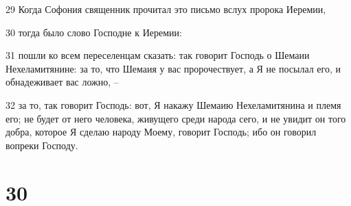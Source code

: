 \par 29 Когда Софония священник прочитал это письмо вслух пророка Иеремии,
\par 30 тогда было слово Господне к Иеремии:
\par 31 пошли ко всем переселенцам сказать: так говорит Господь о Шемаии Нехеламитянине: за то, что Шемаия у вас пророчествует, а Я не посылал его, и обнадеживает вас ложно, --
\par 32 за то, так говорит Господь: вот, Я накажу Шемаию Нехеламитянина и племя его; не будет от него человека, живущего среди народа сего, и не увидит он того добра, которое Я сделаю народу Моему, говорит Господь; ибо он говорил вопреки Господу.

\chapter{30}

